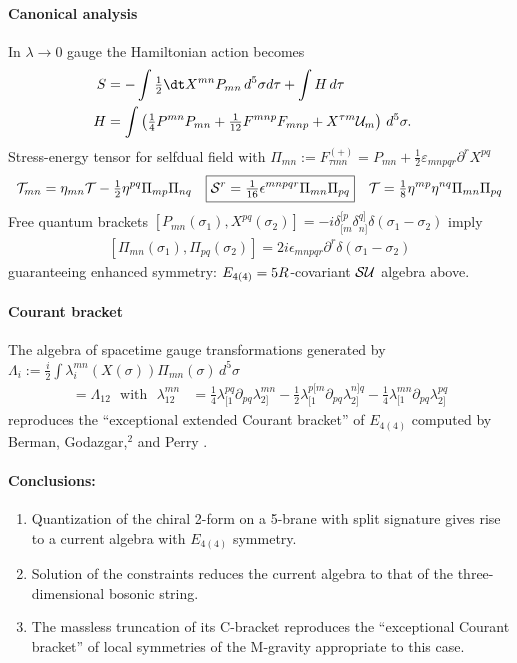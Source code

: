 \documentclass[12pt]{article} %
\numberwithin{equation}{section}
\def\S{{\cal S}}
\def\T{{\cal T}}
\def\U{{\cal U}}
\begin{document}
{%
\paragraph{
	Canonical analysis
}
In  $\lambda \to 0$ gauge the Hamiltonian action becomes
\begin{align*}
S &= 
	-\int  \tfrac12 \dt X{}^{mn} P_{mn} \,d^5\sigma d\tau
	+\int  H \, d\tau
\cr
H&= \int 
	\left(
	\tfrac14 P^{mn} P_{mn} 
	+ \tfrac1{12} F^{mnp}F_{mnp}
	+ X^{\tau m} \U_m 
	\right) \, d^5 \sigma .	
\end{align*}
Stress-energy tensor for selfdual field with $\Pi_{mn} := F^{(+)}_{\tau mn} = P_{mn} +\tfrac12 \varepsilon_{mnpqr} \partial^r X^{pq}$
\begin{align*}
\T_{mn} = \eta_{mn} \T - \tfrac12 \eta^{pq}\Pi_{mp}\Pi_{nq}
~~~
\boxed{\S^r = \tfrac1{16} \epsilon^{mnpqr} \Pi_{mn} \Pi_{pq}}
~~~
\T = \tfrac18 \eta^{mp}\eta^{nq} \Pi_{mn}\Pi_{pq}
\end{align*}
Free quantum brackets $[P_{mn}(\sigma_1) , X^{pq}(\sigma_2) ] = -i \delta_{[m}^{[p}\delta_{n]}^{q]} \delta(\sigma_1 - \sigma_2)$ imply
\begin{align*}
\boxed{[\Pi_{mn}(\sigma_1) , \Pi_{pq}(\sigma_2) ] = 2i \epsilon_{mnpqr} \partial^r \delta(\sigma_1 - \sigma_2) }
\end{align*}
guaranteeing enhanced symmetry: $E_{4(4)} = \sl5R$-covariant $\S\U$ algebra above.

\paragraph{
	Courant bracket
}
The algebra of spacetime gauge transformations generated by $\Lambda_i := \tfrac i2 \int  \lambda_i^{mn}(X(\sigma)) \Pi_{mn}(\sigma) \,d^5\sigma$
\begin{align*}
[\Lambda_1, \Lambda_2 ] = \Lambda_{12}
~~~\mathrm{with}~~~
\lambda_{12}^{mn} 
	&= \tfrac14 \lambda_{[1}^{pq}\partial_{pq} \lambda_{2]}^{mn}
	-\tfrac12 \lambda_{[1}^{p[m}\partial_{pq} \lambda_{2]}^{n]q}
	-\tfrac14 \lambda_{[1}^{mn}\partial_{pq} \lambda_{2]}^{pq} 
\end{align*}
reproduces the ``exceptional extended Courant bracket'' of $E_{4(4)}$ computed by
Berman, Godazgar,${}^2$ and Perry \cite{Berman:2011cg}.

\paragraph{
	Conclusions:
}
\begin{enumerate}
\item Quantization of the chiral 2-form on a 5-brane with split signature gives rise to a current algebra with $E_{4(4)}$ symmetry. 
\item Solution of the constraints reduces the current algebra to that of the three-dimensional bosonic string. 
\item The massless truncation of its C-bracket reproduces the ``exceptional Courant bracket'' of local symmetries of the M-gravity appropriate to this case.
\end{enumerate}


}
\end{document}
